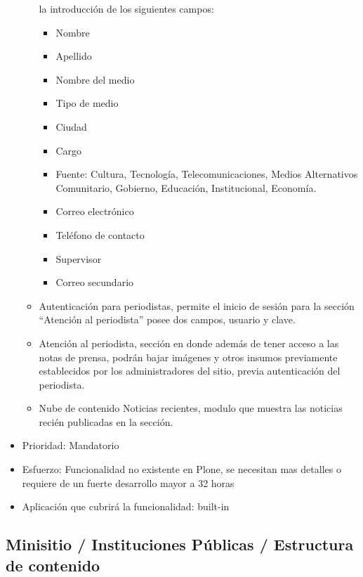 \documentclass[11pt, letterpaper, oneside, spanish]{scrbook}
\begin{document}
\begin{itemize}
\begin{itemize}
    la introducción de los siguientes campos:
\begin{itemize}
\item Nombre
\item Apellido
\item Nombre del medio
\item Tipo de medio
\item Ciudad
\item Cargo
\item Fuente: Cultura, Tecnología, Telecomunicaciones, Medios Alternativos
      Comunitario, Gobierno, Educación, Institucional, Economía.
\item Correo electrónico
\item Teléfono de contacto
\item Supervisor
\item Correo secundario
\end{itemize}
\item Autenticación para periodistas, permite el inicio de sesión para la
    sección “Atención al periodista” posee dos campos, usuario y clave.
\item Atención al periodista, sección en donde además de tener acceso a las
    notas de prensa, podrán bajar imágenes y otros insumos previamente
    establecidos por los administradores del sitio, previa autenticación del
    periodista.
\item Nube de contenido Noticias recientes, modulo que muestra las noticias
    recién publicadas en la sección.
\end{itemize}
\item Prioridad: Mandatorio
\item Esfuerzo: Funcionalidad no existente en Plone, se necesitan mas detalles o
  requiere de un fuerte desarrollo mayor a 32 horas
\item Aplicación que cubrirá la funcionalidad:  built-in
\end{itemize}
\subsection{Minisitio / Instituciones Públicas / Estructura de contenido}
\label{sec-2-1-39}
\end{document}
